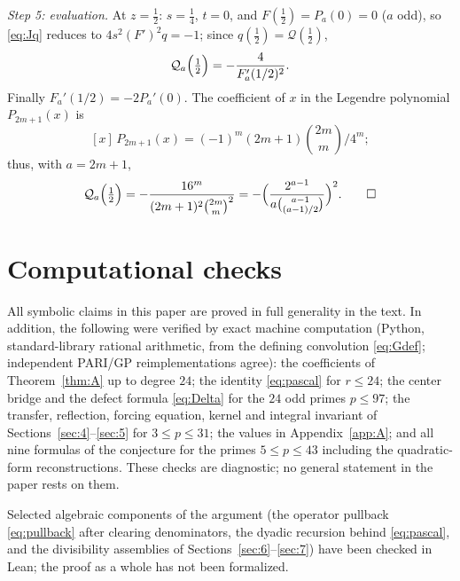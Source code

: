 \documentclass[11pt]{amsart}
\theoremstyle{definition}
\theoremstyle{remark}
\begin{document}
\emph{Step 5: evaluation.} At $z=\frac12$: $s=\frac14$, $t=0$, and
$F(\frac12)=P_a(0)=0$ ($a$ odd), so \eqref{eq:Jq} reduces to
$4s^2(F')^2q=-1$; since $q(\frac12)=\mathcal Q(\frac12)$,
\[
\mathcal Q_a\Bigl(\tfrac12\Bigr)=-\frac{4}{F_a'(1/2)^2}.
\]
Finally $F_a'(1/2)=-2P_a'(0)$. The coefficient of $x$ in the Legendre
polynomial $P_{2m+1}(x)$ is
\[
[x]\,P_{2m+1}(x)=(-1)^m(2m+1)\binom{2m}{m}\big/4^m;
\]
thus, with $a=2m+1$,
\[
\mathcal Q_a\Bigl(\tfrac12\Bigr)
=-\frac{16^m}{(2m+1)^2\binom{2m}{m}^2}
=-\Bigl(\frac{2^{a-1}}{a\binom{a-1}{(a-1)/2}}\Bigr)^2 .
\qed
\]

\section{Computational checks}\label{app:D}

All symbolic claims in this paper are proved in full generality in the
text. In addition, the following were verified by exact machine
computation (Python, standard-library rational arithmetic, from the
defining convolution \eqref{eq:Gdef}; independent PARI/GP
reimplementations agree): the coefficients of Theorem~\ref{thm:A} up to
degree $24$; the identity \eqref{eq:pascal} for $r\le24$; the center
bridge and the defect formula \eqref{eq:Delta} for the $24$ odd primes
$p\le97$; the transfer, reflection, forcing equation, kernel and
integral invariant of Sections~\ref{sec:4}--\ref{sec:5} for
$3\le p\le31$; the values in Appendix~\ref{app:A}; and all nine
formulas of the conjecture for the primes $5\le p\le43$ including the
quadratic-form reconstructions. These checks are diagnostic; no general
statement in the paper rests on them.

Selected algebraic components of the argument (the operator pullback
\eqref{eq:pullback} after clearing denominators, the dyadic recursion
behind \eqref{eq:pascal}, and the divisibility assemblies of
Sections~\ref{sec:6}--\ref{sec:7}) have been checked in Lean; the proof
as a whole has not been formalized.



\end{document}
